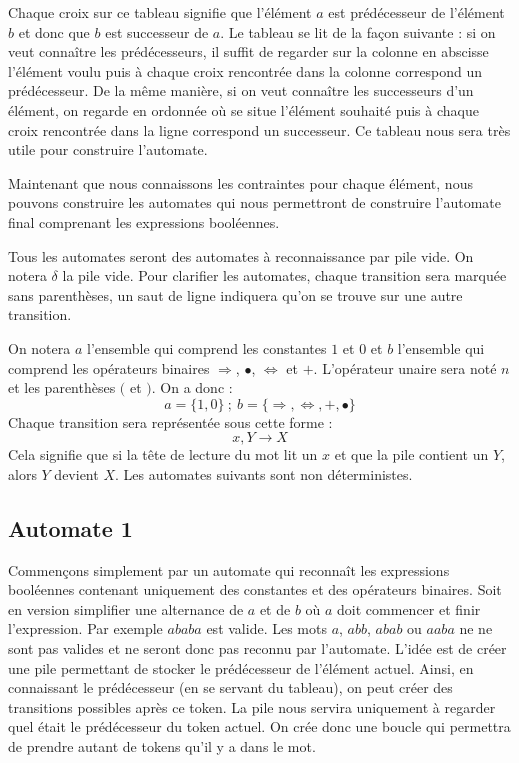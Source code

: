 \documentclass{Support}
\begin{document}
\vspace{0,4cm}
Chaque croix sur ce tableau signifie que l'élément $a$ est prédécesseur de l'élément $b$ et donc que $b$ est successeur de $a$. Le tableau se lit de la façon suivante : si on veut connaître les prédécesseurs, il suffit de regarder sur la colonne en abscisse l'élément voulu puis à chaque croix rencontrée dans la colonne correspond un prédécesseur. De la même manière, si on veut connaître les successeurs d'un élément, on regarde en ordonnée où se situe l'élément souhaité puis à chaque croix rencontrée dans la ligne correspond un successeur. Ce tableau nous sera très utile pour construire l'automate.

Maintenant que nous connaissons les contraintes pour chaque élément, nous pouvons construire les automates qui nous permettront de construire l'automate final comprenant les expressions booléennes.

Tous les automates seront des automates à reconnaissance par pile vide. On notera $\delta$ la pile vide. Pour clarifier les automates, chaque transition sera marquée sans parenthèses, un saut de ligne indiquera qu'on se trouve sur une autre transition.

On notera $a$ l'ensemble qui comprend les constantes $1$ et $0$ et $b$ l'ensemble qui comprend les opérateurs binaires $\Rightarrow$, $\bullet$, $\iff$ et $+$. L'opérateur unaire sera noté $n$ et les parenthèses $($ et $)$. On a donc : 
$$
a= \{1,0 \} \ ; \ b = \{\Rightarrow, \iff, +, \bullet \} 
$$
Chaque transition sera représentée sous cette forme : 
$$
x, Y \rightarrow X
$$
Cela signifie que si la tête de lecture du mot lit un $x$ et que la pile contient un $Y$, alors $Y$ devient $X$. Les automates suivants sont non déterministes.
\subsection{Automate 1}
Commençons simplement par un automate qui reconnaît les expressions booléennes contenant uniquement des constantes et des opérateurs binaires. Soit en version simplifier une alternance de $a$ et de $b$ où $a$ doit commencer et finir l'expression. Par exemple $ababa$ est valide.  Les mots $a$, $abb$, $abab$ ou $aaba$ ne ne sont pas valides et ne seront donc pas reconnu par l'automate. L'idée est de créer une pile permettant de stocker le prédécesseur de l'élément actuel. Ainsi, en connaissant le prédécesseur (en se servant du tableau), on peut créer des transitions possibles après ce token. La pile nous servira uniquement à regarder quel était le prédécesseur du token actuel. On crée donc une boucle qui permettra de prendre autant de tokens qu'il y a dans le mot.
\end{document}
